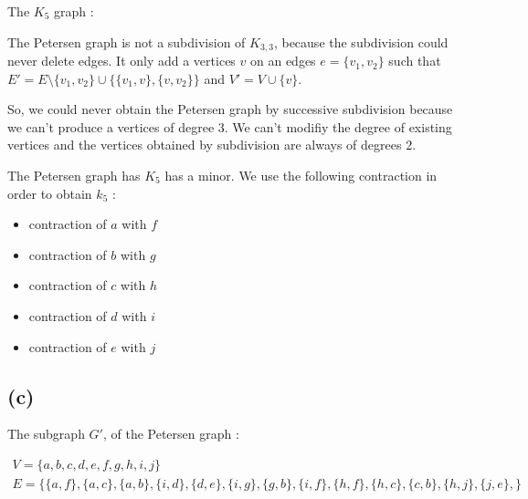 \documentclass[a4paper,11pt]{report}
\newcommand*{\contract}[2]{contraction of $#1$ with $#2$}
\begin{document}
The $K_5$ graph :

\begin{center}
\end{center}

The Petersen graph is not a subdivision of $K_{3,3}$, because the subdivision
could never delete edges. It only add a vertices $v$ on an edges $e =
\{v_1,v_2\}$ such that $E' = E \setminus \{v_1,v_2\} \cup
\{\{v_1,v\},\{v,v_2\}\}$ and $V' = V \cup \{v\}$.

So, we could never obtain the Petersen graph by successive subdivision because
we can't produce a vertices of degree $3$. We can't modifiy the degree of
existing vertices and the vertices obtained by subdivision are always of degrees
$2$.

The Petersen graph has $K_5$ has a minor. We use the following contraction in
order to obtain $k_5$ :
\begin{itemize}
\item \contract{a}{f}
\item \contract{b}{g}
\item \contract{c}{h}
\item \contract{d}{i}
\item \contract{e}{j}
\end{itemize}

\begin{center}
\end{center}

\subsection*{(c)}

The subgraph $G'$, of the Petersen graph :

\begin{gather*}
  V = \{a,b,c,d,e,f,g,h,i,j\}\\
  E = \{
  \{a,f\},
  \{a,c\},
  \{a,b\},
  \{i,d\},
  \{d,e\},
  \{i,g\},
  \{g,b\},
  \{i,f\},
  \{h,f\},
  \{h,c\},
  \{c,b\},
  \{h,j\},
  \{j,e\},
  \}
\end{gather*}
\end{document}
